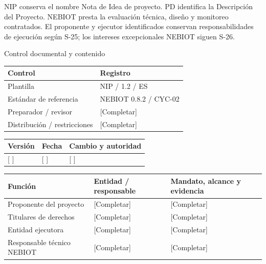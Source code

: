 \vspace{2mm}
NIP conserva el nombre Nota de Idea de proyecto. PD identifica la Descripción del Proyecto.
\vspace{2mm}
NEBIOT presta la evaluación técnica, diseño y monitoreo contratados. El proponente y ejecutor identificados conservan responsabilidades de ejecución según S-25; los intereses excepcionales NEBIOT siguen S-26.
\clearpage
{\fontsize{23}{27}\selectfont\color{NEBGreen}Control documental y contenido\par}
\vspace{3mm}
{\sffamily\fontsize{8.3}{10.3}\selectfont\begin{longtable}{@{}P{50.55mm} P{117.94mm}@{}}
\toprule
\textbf{Control} & \textbf{Registro}\\\midrule\endhead
\rule{0pt}{7.7mm}Plantilla & NIP / 1.2 / ES\\\hline
\rule{0pt}{7.7mm}Estándar de referencia & NEBIOT 0.8.2 / CYC-02\\\hline
\rule{0pt}{7.7mm}Preparador / revisor & [Completar]\\\hline
\rule{0pt}{7.7mm}Distribución / restricciones & [Completar]\\\hline
\end{longtable}}
{\sffamily\fontsize{8.3}{10.3}\selectfont\begin{longtable}{@{}P{31.34mm} P{37.94mm} P{95.68mm}@{}}
\toprule
\textbf{Versión} & \textbf{Fecha} & \textbf{Cambio y autoridad}\\\midrule\endhead
\rule{0pt}{7.7mm}[ ] & [ ] & [ ]\\\hline
\end{longtable}}
{\sffamily\fontsize{9.5}{11.4}\selectfont\tableofcontents}
{\sffamily\fontsize{8.3}{10.3}\selectfont\begin{longtable}{@{}P{41.24mm} P{46.19mm} P{77.54mm}@{}}
\toprule
\textbf{Función} & \textbf{Entidad / responsable} & \textbf{Mandato, alcance y evidencia}\\\midrule\endhead
\rule{0pt}{7.7mm}Proponente del proyecto & [Completar] & [Completar]\\\hline
\rule{0pt}{7.7mm}Titulares de derechos & [Completar] & [Completar]\\\hline
\rule{0pt}{7.7mm}Entidad ejecutora & [Completar] & [Completar]\\\hline
\rule{0pt}{7.7mm}Responsable técnico NEBIOT & [Completar] & [Completar]\\\hline
\end{longtable}}
